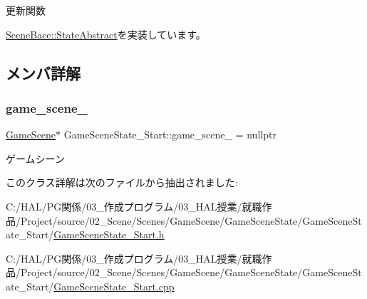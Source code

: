 更新関数 



\mbox{\hyperlink{class_scene_bace_1_1_state_abstract_a949637cf8453ddd6a8e38fdbd6e4006e}{Scene\+Bace\+::\+State\+Abstract}}を実装しています。



\subsection{メンバ詳解}
\mbox{\label{class_game_scene_state___start_af9389c7c8496419a6a4a3d3339acd94f}} 
\subsubsection{\texorpdfstring{game\+\_\+scene\+\_\+}{game\_scene\_}}
{\footnotesize\ttfamily \mbox{\hyperlink{class_game_scene}{Game\+Scene}}$\ast$ Game\+Scene\+State\+\_\+\+Start\+::game\+\_\+scene\+\_\+ = nullptr\hspace{0.3cm}{\ttfamily [protected]}}



ゲームシーン 



このクラス詳解は次のファイルから抽出されました\+:\begin{DoxyCompactItemize}
\item 
C\+:/\+H\+A\+L/\+P\+G関係/03\+\_\+作成プログラム/03\+\_\+\+H\+A\+L授業/就職作品/\+Project/source/02\+\_\+\+Scene/\+Scenes/\+Game\+Scene/\+Game\+Scene\+State/\+Game\+Scene\+State\+\_\+\+Start/\mbox{\hyperlink{_game_scene_state___start_8h}{Game\+Scene\+State\+\_\+\+Start.\+h}}\item 
C\+:/\+H\+A\+L/\+P\+G関係/03\+\_\+作成プログラム/03\+\_\+\+H\+A\+L授業/就職作品/\+Project/source/02\+\_\+\+Scene/\+Scenes/\+Game\+Scene/\+Game\+Scene\+State/\+Game\+Scene\+State\+\_\+\+Start/\mbox{\hyperlink{_game_scene_state___start_8cpp}{Game\+Scene\+State\+\_\+\+Start.\+cpp}}\end{DoxyCompactItemize}
